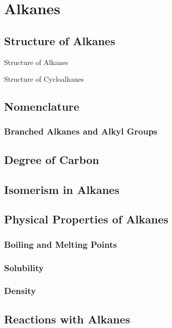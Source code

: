 \documentclass[../main]{subfiles}
\begin{document}
\section{Alkanes}

	\subsection{Structure of Alkanes}

	Structure of Alkanes

	Structure of Cycloalkanes

	\subsection{Nomenclature}

	\subsubsection{Branched Alkanes and Alkyl Groups}

	\subsection{Degree of Carbon}

	\subsection{Isomerism in Alkanes}

	\subsection{Physical Properties of Alkanes}

	\subsubsection{Boiling and Melting Points}

	\subsubsection{Solubility}

	\subsubsection{Density}

	\subsection{Reactions with Alkanes}
\end{document}
